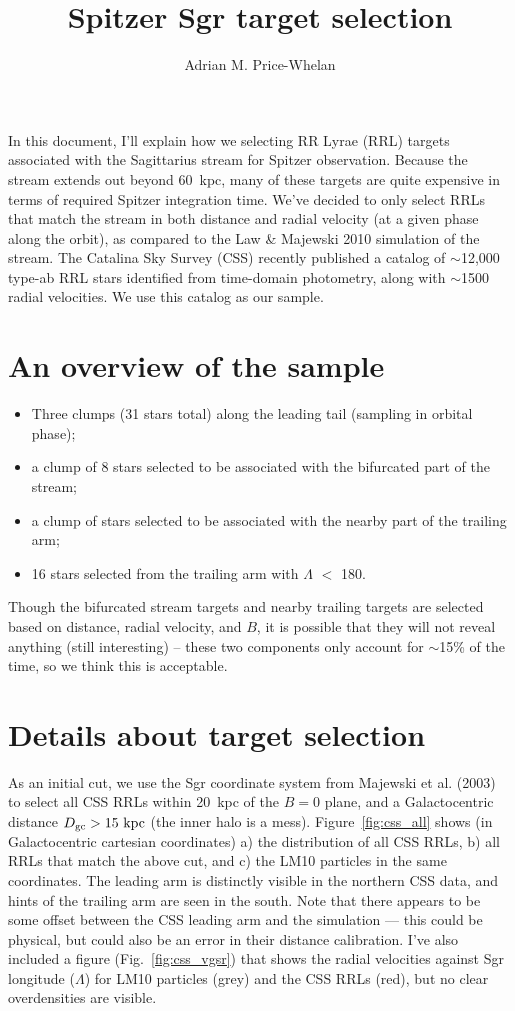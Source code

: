 \documentclass[letterpaper,12pt,preprint]{aastex}
\begin{document}
\title{Spitzer Sgr target selection}
\author{Adrian M. Price-Whelan}

In this document, I'll explain how we selecting RR Lyrae (RRL) targets associated with the Sagittarius stream for Spitzer observation. Because the stream extends out beyond 60~kpc, many of these targets are quite expensive in terms of required Spitzer integration time. We've decided to only select RRLs that match the stream in both distance and radial velocity (at a given phase along the orbit), as compared to the Law \& Majewski 2010 simulation of the stream. The Catalina Sky Survey (CSS) recently published a catalog of $\sim$12,000 type-ab RRL stars identified from time-domain photometry, along with $\sim$1500 radial velocities. We use this catalog as our sample.

\section{An overview of the sample}
\begin{itemize}
	\item Three clumps (31 stars total) along the leading tail (sampling in orbital phase);
	\item a clump of 8 stars selected to be associated with the bifurcated part of the stream;
	\item a clump of   stars selected to be associated with the nearby part of the trailing arm;
	\item 16 stars selected from the trailing arm with $\Lambda$ $<$ 180.
\end{itemize}
Though the bifurcated stream targets and nearby trailing targets are selected based on distance, radial velocity, and $B$, it is possible that they will not reveal anything (still interesting) -- these two components only account for $\sim$15\% of the time, so we think this is acceptable.

\section{Details about target selection}

As an initial cut, we use the Sgr coordinate system from Majewski et al. (2003) to select all CSS RRLs within 20~kpc of the $B=0$ plane, and a Galactocentric distance $D_{\rm gc} > 15~{\rm kpc}$ (the inner halo is a mess). Figure~\ref{fig:css_all} shows (in Galactocentric cartesian coordinates) a) the distribution of all CSS RRLs, b) all RRLs that match the above cut, and c) the LM10 particles in the same coordinates. The leading arm is distinctly visible in the northern CSS data, and hints of the trailing arm are seen in the south. Note that there appears to be some offset between the CSS leading arm and the simulation --- this could be physical, but could also be an error in their distance calibration. I've also included a figure (Fig.~\ref{fig:css_vgsr}) that shows the radial velocities against Sgr longitude ($\Lambda$) for LM10 particles (grey) and the CSS RRLs (red), but no clear overdensities are visible.
\end{document}
